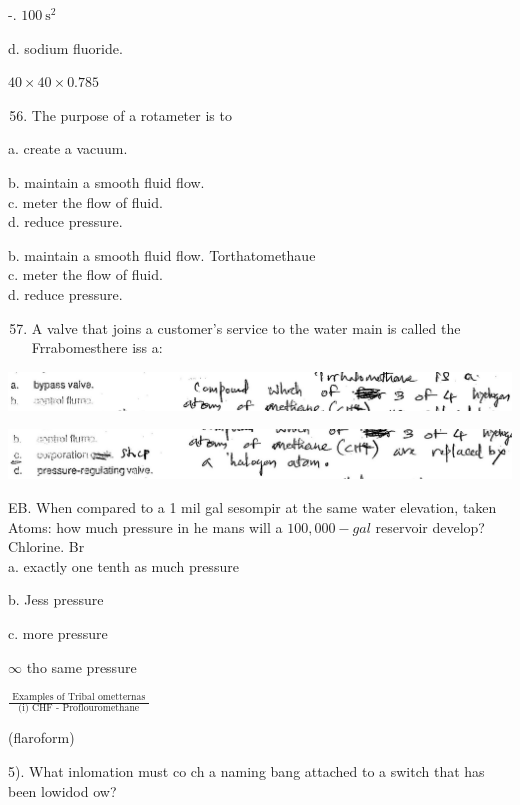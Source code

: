 \documentclass[10pt]{article}
\begin{document}
-. $100 \mathrm{~s}^{2}$

d. sodium fluoride.

$40 \times 40 \times 0.785$

\begin{enumerate}
  \setcounter{enumi}{55}
  \item The purpose of a rotameter is to
\end{enumerate}

a. create a vacuum.


b. maintain a smooth fluid flow.\\
c. meter the flow of fluid.\\
d. reduce pressure.

b. maintain a smooth fluid flow. Torthatomethaue\\
c. meter the flow of fluid.\\
d. reduce pressure.

\begin{enumerate}
  \setcounter{enumi}{56}
  \item A valve that joins a customer's service to the water main is called the Frrabomesthere iss a:
\end{enumerate}

\includegraphics[max width=\textwidth]{2022_11_11_ca6a6c1a0324ee23e523g-25}

\includegraphics[max width=\textwidth]{2022_11_11_ca6a6c1a0324ee23e523g-25(1)}

EB. When compared to a 1 mil gal sesompir at the same water elevation, taken Atoms: how much pressure in he mans will a $100,000-g a l$ reservoir develop? Chlorine. Br\\
a. exactly one tenth as much pressure

b. Jess pressure

c. more pressure

$\infty$ tho same pressure

$\frac{\text { Examples of Tribal ometternas }}{\text { (i) CHF - Proflouromethane }}$

(flaroform)

5). What inlomation must co ch a naming bang attached to a switch that has been lowidod ow?
\end{document}
